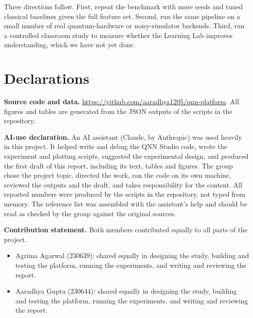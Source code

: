 \documentclass[12pt,onecolumn,draftclsnofoot]{IEEEtran}
\begin{document}
Three directions follow. First, repeat the benchmark with more seeds and tuned classical baselines given the full feature set. Second, run the same pipeline on a small number of real quantum-hardware or noisy-simulator backends. Third, run a controlled classroom study to measure whether the Learning Lab improves understanding, which we have not yet done.

\section*{Declarations}
\textbf{Source code and data.} \url{https://github.com/aaradhya1205/qnn-platform}. All figures and tables are generated from the JSON outputs of the scripts in the repository.

\textbf{AI-use declaration.} An AI assistant (Claude, by Anthropic) was used heavily in this project. It helped write and debug the QNN Studio code, wrote the experiment and plotting scripts, suggested the experimental design, and produced the first draft of this report, including its text, tables and figures. The group chose the project topic, directed the work, ran the code on its own machine, reviewed the outputs and the draft, and takes responsibility for the content. All reported numbers were produced by the scripts in the repository, not typed from memory. The reference list was assembled with the assistant's help and should be read as checked by the group against the original sources.

\textbf{Contribution statement.} Both members contributed equally to all parts of the project.
\begin{itemize}
  \item Agrima Agarwal (230639): shared equally in designing the study, building and testing the platform, running the experiments, and writing and reviewing the report.
  \item Aaradhya Gupta (230644): shared equally in designing the study, building and testing the platform, running the experiments, and writing and reviewing the report.
\end{itemize}



\end{document}
